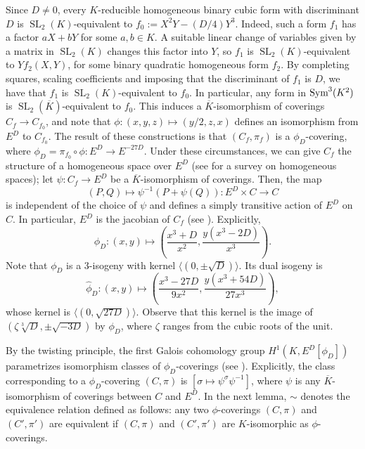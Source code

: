 \documentclass[oneside]{amsart}
\newcommand{\embrace}[3]{\left#1 #3 \right#2}
\newcommand{\lpar}[1]{\embrace{(}{)}{#1}}
\newcommand{\symf}{\textnormal{Sym}^3(K^2)}
\DeclareMathOperator{\spl}{SL}
\theoremstyle{definition}
\begin{document}
Since $D \neq 0$, every $K$-reducible homogeneous binary cubic form with discriminant $D$ is $\spl_2(K)$-equivalent to $f_0 := X^2Y - (D/4)Y^3$. Indeed, such a form $f_1$ has a factor $aX + bY$ for some $a, b \in K$. A suitable linear change of variables given by a matrix in $\spl_2(K)$ changes this factor into $Y$, so $f_1$ is $\spl_2(K)$-equivalent to $Yf_2(X,Y)$, for some binary quadratic homogeneous form $f_2$. By completing squares, scaling coefficients and imposing that the discriminant of $f_1$ is $D$, we have that $f_1$ is $\spl_2(K)$-equivalent to $f_0$. In particular, any form in $\symf$ is $\spl_2(\overline{K})$-equivalent to $f_0$. This induces a $\overline{K}$-isomorphism of coverings $C_f \to C_{f_0}$, and note that $\phi: (x,y,z)\mapsto (y/2,z,x)$ defines an isomorphism from $E^D$ to $C_{f_0}$. The result of these constructions is that $(C_f, \pi_f)$ is a $\phi_D$-covering, where $\phi_D = \pi_{f_0}\circ \phi : E^D \to E^{-27D}$. Under these circumstances, we can give $C_f$ the structure of a homogeneous space over $E^D$ (see \cite[\S X.3]{Silverman} for a survey on homogeneous spaces); let $\psi:C_f \to E^D$ be a $\overline{K}$-isomorphism of coverings. Then, the map 
$$
(P,Q)\longmapsto \psi^{-1}(P + \psi(Q)):E^D\times C \to C
$$
is independent of the choice of $\psi$ and defines a simply transitive action of $E^D$ on $C$. In particular, $E^D$ is the jacobian of $C_f$ (see \cite[\S X, Thm. 3.8]{Silverman}). Explicitly,
\begin{equation}
    \label{equation: isogeny}
    \phi_D:(x,y) \mapsto \lpar{\frac{x^3 + D}{x^2}, \frac{y(x^3 - 2D)}{x^3}}.
\end{equation}
Note that $\phi_D$ is a 3-isogeny with kernel $\langle(0, \pm \sqrt{D})\rangle$. Its dual isogeny is 
$$
\hat{\phi}_D : (x,y) \mapsto \lpar{\frac{x^3 - 27D}{9x^2}, \frac{y(x^3 + 54D)}{27x^3}},
$$
whose kernel is $\langle (0, \sqrt{27D})\rangle$. Observe that this kernel is the image of $(\zeta\sqrt[3]{D}, \pm \sqrt{-3D})$ by $\phi_D$, where $\zeta$ ranges from the cubic roots of the unit. 

By the twisting principle, the first Galois cohomology group $H^1(K, E^D[\phi_D])$ parametrizes isomorphism classes of $\phi_D$-coverings (see \cite[\S 2]{CREUTZ2012673}). Explicitly, the class corresponding to a $\phi_D$-covering $(C, \pi)$ is $[\sigma \mapsto \psi^{\sigma}\psi^{-1}]$, where $\psi$ is any $\overline{K}$-isomorphism of coverings between $C$ and $E^D$. In the next lemma, $\sim$ denotes the equivalence relation defined as follows: any two $\phi$-coverings $(C,\pi)$ and $(C',\pi')$ are equivalent if $(C,\pi)$ and $(C',\pi')$ are $K$-isomorphic as $\phi$-coverings.
\end{document}
